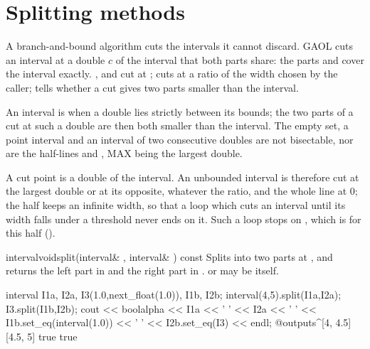 \documentclass[12pt,a4paper,twoside,openright]{book}
\begin{document}
\section{Splitting methods}\label{sec:splitting}
%

A branch-and-bound algorithm cuts the intervals it cannot discard. GAOL cuts
an interval  at a double $c$ of the interval that both parts
share: the parts  and  cover the interval exactly.
,  and  cut at
;  cuts at a ratio of the width chosen by
the caller;  tells whether a cut gives two parts
smaller than the interval.

\begin{Def}\label{def:functions-bisectable}
An interval is  when a double lies strictly between its
bounds; the two parts of a cut at such a double are then both smaller than
the interval. The empty set, a point interval and an interval of two
consecutive doubles are not bisectable, nor are the half-lines
 and , MAX being the
largest double.
\end{Def}

\begin{Rem}\label{rem:functions-unbounded-cut}
A cut point is a double of the interval. An unbounded interval is therefore
cut at the largest double or at its opposite, whatever the ratio, and the
whole line at $0$; the half  keeps an infinite
width, so that a loop which cuts an interval until its width falls under a
threshold never ends on it. Such a loop stops on ,
which is  for this half ().\newinvfive
\end{Rem}

\begin{defmethod}{interval}{void}{split}{(interval\& , interval\& ) const}
  Splits  into two parts at , and returns the
  left part in  and the right part in .  or
   may be  itself.
  \begin{example}
interval I1a, I2a,
         I3(1.0,next_float(1.0)),
         I1b, I2b;
interval(4,5).split(I1a,I2a);
I3.split(I1b,I2b);
cout << boolalpha << I1a << ' ' << I2a << ' '
     << I1b.set_eq(interval(1.0)) << ' ' << I2b.set_eq(I3) << endl;
@outputs^[4, 4.5] [4.5, 5] true true~
  \end{example}
\end{defmethod}
\end{document}
